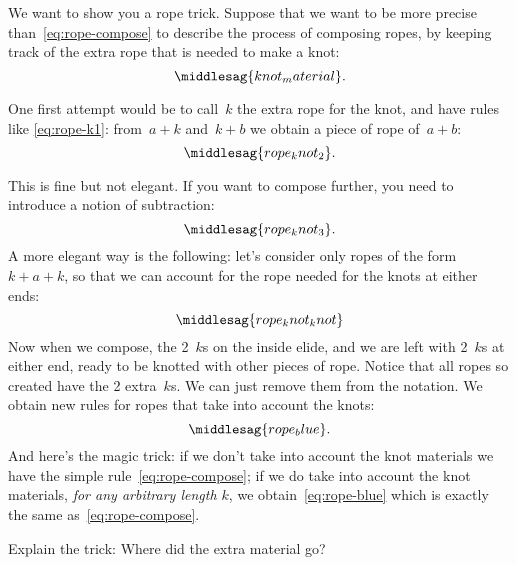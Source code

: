 We want to show you a rope trick.
Suppose that we want to be more precise than~\cref{eq:rope-compose} to describe the process of composing ropes, by keeping track of the extra rope that is needed to make a knot:
%
\begin{equation}
    \label{eq:knot_material}
    \middlesag{knot_material}.
\end{equation}

One first attempt would be to call~$k$ the extra rope for the knot, and have rules like \cref{eq:rope-k1}: from~$a + k$ and~$k + b$ we obtain a piece of rope of~$a+b$:
\begin{equation}
    \label{eq:rope-k1}
    \middlesag{rope_knot_2}.
\end{equation}

%
%
This is fine but not elegant.
If you want to compose further, you need to introduce a notion of subtraction:
%
\begin{equation}
    \label{eq:rope-k2}
    \middlesag{rope_knot_3}.
\end{equation}
%
A more elegant way is the following: let's consider only ropes of the form~$k + a + k$, so that we can account for the rope needed for the knots at either ends:
%
\begin{equation}
    \label{eq:rope-kk}
    \middlesag{rope_knot_knot}
\end{equation}
%
Now when we compose, the 2~$k$s on the inside elide, and we are left with 2~$k$s at either end, ready to be knotted with other pieces of rope.
Notice that all ropes so created have the 2 extra~$k$s.
We can just remove them from the notation.
We obtain new rules for ropes that take into account the knots:
%
\begin{equation}
    \label{eq:rope-blue}
    \middlesag{rope_blue}.
\end{equation}
%
And here's the magic trick: if we don't take into account the knot materials we have the simple rule~\cref{eq:rope-compose}; if we do take into account the knot materials, \emph{for any arbitrary length $k$}, we obtain~\cref{eq:rope-blue} which is exactly the same as~\cref{eq:rope-compose}.
\begin{exercise}
    Explain the trick: Where did the extra material go?
\end{exercise}
